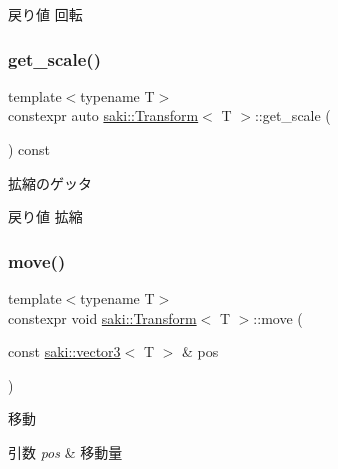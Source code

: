 \begin{DoxyReturn}{戻り値}
回転 
\end{DoxyReturn}
\mbox{\label{classsaki_1_1_transform_a9bf1b1c0b061165e67013538bc2afdb2}} 
\subsubsection{\texorpdfstring{get\+\_\+scale()}{get\_scale()}}
{\footnotesize\ttfamily template$<$typename T$>$ \\
constexpr auto \mbox{\hyperlink{classsaki_1_1_transform}{saki\+::\+Transform}}$<$ T $>$\+::get\+\_\+scale (\begin{DoxyParamCaption}{ }\end{DoxyParamCaption}) const\hspace{0.3cm}{\ttfamily [inline]}}



拡縮のゲッタ 

\begin{DoxyReturn}{戻り値}
拡縮 
\end{DoxyReturn}
\mbox{\label{classsaki_1_1_transform_a5c323904a1862b33a19951d198926c06}} 
\subsubsection{\texorpdfstring{move()}{move()}\hspace{0.1cm}{\footnotesize\ttfamily [1/2]}}
{\footnotesize\ttfamily template$<$typename T$>$ \\
constexpr void \mbox{\hyperlink{classsaki_1_1_transform}{saki\+::\+Transform}}$<$ T $>$\+::move (\begin{DoxyParamCaption}\item[{const \mbox{\hyperlink{classsaki_1_1vector3}{saki\+::vector3}}$<$ T $>$ \&}]{pos }\end{DoxyParamCaption})\hspace{0.3cm}{\ttfamily [inline]}}



移動 


\begin{DoxyParams}{引数}
{\em pos} & 移動量 \\
\hline
\end{DoxyParams}
\mbox{\label{classsaki_1_1_transform_a4224288f8beb594246a2e7d58c7ba478}} 
